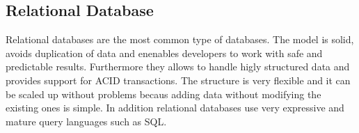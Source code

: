     \subsection{Relational Database}
    Relational databases are the most common type of databases. The model is
    solid, avoids duplication of data and enenables developers to work with safe
    and predictable results. Furthermore they allows to handle higly structured
    data and provides support for ACID transactions. The structure is very
    flexible and it can be scaled up without problems becaus adding data without
    modifying the existing ones is simple. In addition relational databases use
    very expressive and mature query languages such as SQL.
     